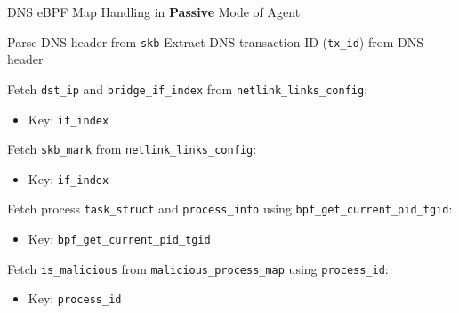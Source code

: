 \documentclass [11pt, proquest] {uwthesis}[2020/02/24]
\begin{document}
\begin{algorithm}[H]
\caption{DNS eBPF Map Handling in \textbf{Passive} Mode of Agent}
\label{sec:alg5}

\small
{}


Parse DNS header from \texttt{skb}\;
Extract DNS transaction ID (\texttt{tx\_id}) from DNS header\;

Fetch \texttt{dst\_ip} and \texttt{bridge\_if\_index} from \texttt{netlink\_links\_config}:
\begin{itemize}[nosep]
    \item Key: \texttt{if\_index}
\end{itemize}

Fetch \texttt{skb\_mark} from \texttt{netlink\_links\_config}:
\begin{itemize}[nosep]
    \item Key: \texttt{if\_index}
\end{itemize}

Fetch process \texttt{task\_struct} and \texttt{process\_info} using \texttt{bpf\_get\_current\_pid\_tgid}:
\begin{itemize}[nosep]
    \item Key: \texttt{bpf\_get\_current\_pid\_tgid}
\end{itemize}

Fetch \texttt{is\_malicious} from \texttt{malicious\_process\_map} using \texttt{process\_id}:
\begin{itemize}[nosep]
    \item Key: \texttt{process\_id}
\end{itemize}

\end{algorithm}
\end{document}
